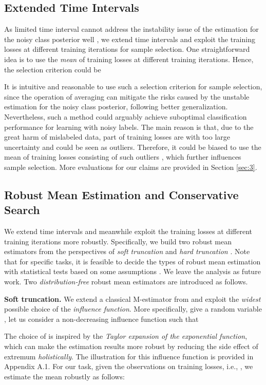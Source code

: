 \documentclass[11pt]{article}
\begin{document}
\subsection{Extended Time Intervals}\label{sec:2.2}
As limited time interval cannot address the instability issue of the estimation for the noisy class posterior well \citep{pleiss2020identifying}, we extend time intervals and exploit the training losses at different training iterations for sample selection. One straightforward idea is to use the \textit{mean} of training losses at different training iterations. Hence, the selection criterion could be 

It is intuitive and reasonable to use such a selection criterion for sample selection, since the operation of averaging can mitigate the risks caused by the unstable estimation for the noisy class posterior, following better generalization. Nevertheless, such a method could arguably achieve suboptimal classification performance for learning with noisy labels. The main reason is that, due to the great harm of mislabeled data, part of training losses are with too large uncertainty and could be seen as outliers. Therefore, it could be biased to use the mean of training losses consisting of such outliers \citep{diakonikolas2020outlier}, which further influences sample selection. More evaluations for our claims are provided in Section \ref{sec:3}.
\subsection{Robust Mean Estimation and Conservative Search}\label{sec:2.3}
We extend time intervals and meanwhile exploit the training losses at different training iterations more robustly. Specifically, we build two robust mean estimators from the perspectives of \textit{soft truncation} and \textit{hard truncation} \citep{catoni2012challenging}. Note that for specific tasks, it is feasible to decide the types of robust mean estimation with statistical tests based on some assumptions \citep{chakrabarty2012understanding}. We leave the analysis as future work. Two \textit{distribution-free} robust mean estimators are introduced as follows.

\textbf{Soft truncation.} We extend a classical M-estimator from \citep{catoni2012challenging} and exploit the \textit{widest} possible choice of the \textit{influence function}. More specifically, give a random variable , let us consider a non-decreasing influence function  such that

The choice of  is inspired by the \textit{Taylor expansion of the exponential function}, which can make the estimation results more robust by reducing the side effect of extremum \textit{holistically}. The illustration for this influence function is provided in Appendix A.1. For our task, given the observations on training losses, i.e., , we estimate the mean robustly as follows:
\end{document}
